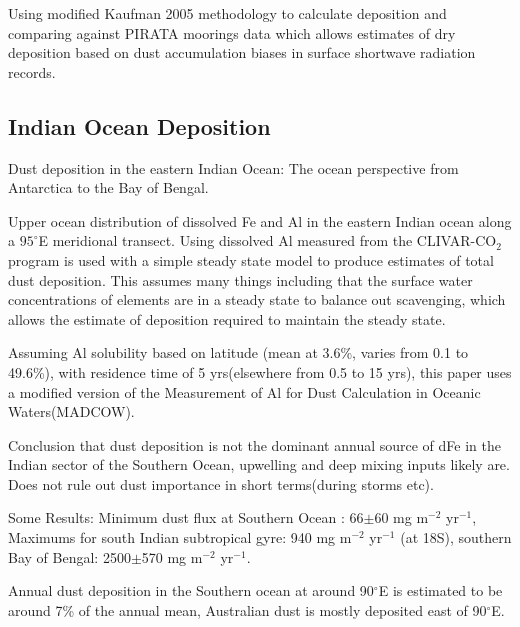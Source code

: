 Using modified Kaufman 2005 methodology to calculate deposition and comparing against PIRATA moorings data which allows estimates of dry deposition based on dust accumulation biases in surface shortwave radiation records.

\subsection{Indian Ocean Deposition \cite{Grand_2015}}
Dust deposition in the eastern Indian Ocean: The ocean perspective from Antarctica to the Bay of Bengal.

Upper ocean distribution of dissolved Fe and Al in the eastern Indian ocean along a $95^{\circ}$E meridional transect.
Using dissolved Al measured from the CLIVAR-CO$_{2}$ program is used with a simple steady state model to produce estimates of total dust deposition. This assumes many things including that the surface water concentrations of elements are in a steady state to balance out scavenging, which allows the estimate of deposition required to maintain the steady state.

Assuming Al solubility based on latitude (mean at 3.6\%, varies from 0.1 to 49.6\%), with residence time of 5 yrs(elsewhere from 0.5 to 15 yrs), this paper uses a modified version of the Measurement of Al for Dust Calculation in Oceanic Waters(MADCOW).

Conclusion that dust deposition is not the dominant annual source of dFe in the Indian sector of the Southern Ocean, upwelling and deep mixing inputs likely are.
Does not rule out dust importance in short terms(during storms etc).

Some Results:
Minimum dust flux at Southern Ocean : 66$\pm$60 mg m$^{-2}$ yr$^{-1}$, 
Maximums for south Indian subtropical gyre: 940 mg m$^{-2}$ yr$^{-1}$ (at 18S),
southern Bay of Bengal: 2500$\pm$570 mg m$^{-2}$ yr$^{-1}$.

Annual dust deposition in the Southern ocean at around 90$^{\circ}$E is estimated to be around 7\% of the annual mean, Australian dust is mostly deposited east of 90$^{\circ}$E.

  
  
  
  
  
  
  
